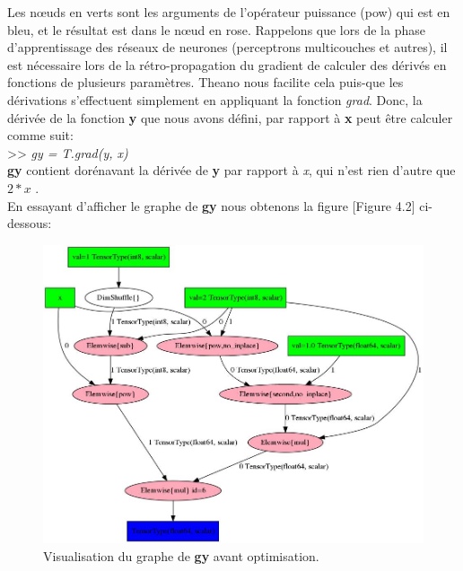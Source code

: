 	Les nœuds en verts sont les arguments de l'opérateur puissance (pow) qui est en bleu, et le résultat est dans le nœud en rose.
	Rappelons que lors de la phase d'apprentissage des réseaux de neurones (perceptrons multicouches et autres), il est nécessaire lors de la rétro-propagation du gradient de calculer des dérivés en fonctions de plusieurs paramètres. Theano nous facilite cela puis-que les dérivations s'effectuent simplement en appliquant la fonction \textit{grad}. 
Donc, la dérivée de la fonction \textbf{y} que nous avons défini, par rapport à \textbf{x} peut être calculer comme suit: \\

>> \textit{gy = T.grad(y, x)}\\

\textbf{gy} contient dorénavant la dérivée de \textbf{y} par rapport à \textit{x}, qui n'est rien d'autre que $2*x$ .\\

 
	En essayant d'afficher le graphe de \textbf{gy} nous obtenons la figure [Figure 4.2] ci-dessous:

\begin{figure}[H]
	\centering
		\includegraphics[width=5in]{Figures/beforeOptimization.png}
	\caption[TheanoGraph]{Visualisation du graphe de \textbf{gy} avant optimisation.}
	\label{fig:Electron}
\end{figure}

